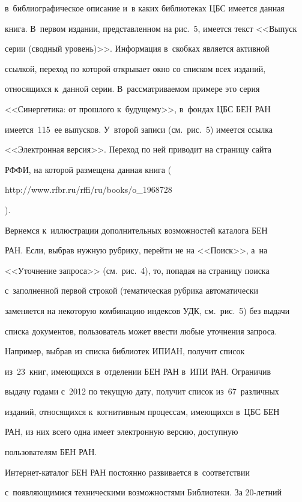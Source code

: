 в~биб\-лио\-гра\-фи\-че\-ское описание и~в каких библиотеках ЦБС имеется данная 

книга. В~первом издании, пред\-став\-лен\-ном на рис.~5, имеется текст <<Выпуск 

серии (сводный уровень)>>. Информация в~скоб\-ках является активной 

ссылкой, переход по которой открывает окно со списком всех изданий, 

относящихся к~данной серии. В~рас\-смат\-ри\-ва\-емом примере это серия 

<<Синергетика: от прош\-ло\-го к~будущему>>, в~фондах ЦБС БЕН РАН 

имеется~115~ее выпусков. У~второй записи (см.\ рис.~5) имеется ссылка 

<<Электронная версия>>. Переход по ней приводит на страницу сай\-та 

РФФИ, на которой размещена данная книга ({\small{\sf 

http://www.rfbr.ru/rffi/ru/books/o\_1968728}}).

  

  Вернемся к~иллюстрации дополнительных возможностей каталога БЕН 

РАН. Если, выбрав нужную рубрику, перейти не на <<Поиск>>, а~на 

<<Уточнение запроса>> (см.\ рис.~4), то, попадая на страницу поиска 

с~заполненной первой строкой (тематическая рубрика автоматически 

заменяется на некоторую комбинацию индексов УДК, см.\ рис.~5) без выдачи 

списка документов, пользователь может ввести любые уточнения запроса. 

Например, выбрав из списка библиотек ИПИАН, получит список 

из~23~книг, имеющихся в~отделении БЕН РАН в~ИПИ РАН. Ограничив 

выдачу годами с~2012 по текущую дату, получит список из~67~различных 

изданий, относящихся к~когнитивным процессам, имеющихся в~ЦБС БЕН 

РАН, из них всего одна имеет электронную версию, доступную 

пользователям БЕН РАН. 

  

  Интернет-каталог БЕН РАН постоянно развивается в~соответствии 

с~появляющимися техническими возможностями Библиотеки. За 20-лет\-ний 

